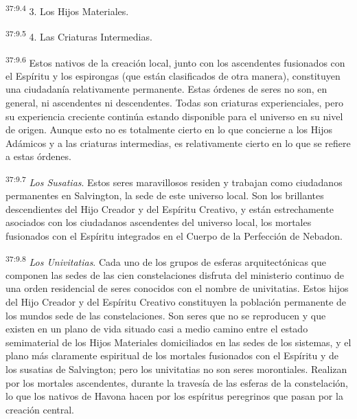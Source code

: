 \par
\textsuperscript{37:9.4} 3. Los Hijos Materiales.

\par
\textsuperscript{37:9.5} 4. Las Criaturas Intermedias.

\par
\textsuperscript{37:9.6} Estos nativos de la creación local, junto con los ascendentes fusionados con el Espíritu y los espirongas (que están clasificados de otra manera), constituyen una ciudadanía relativamente permanente. Estas órdenes de seres no son, en general, ni ascendentes ni descendentes. Todas son criaturas experienciales, pero su experiencia creciente continúa estando disponible para el universo en su nivel de origen. Aunque esto no es totalmente cierto en lo que concierne a los Hijos Adámicos y a las criaturas intermedias, es relativamente cierto en lo que se refiere a estas órdenes.

\par
\textsuperscript{37:9.7} \textit{Los Susatias}. Estos seres maravillosos residen y trabajan como ciudadanos permanentes en Salvington, la sede de este universo local. Son los brillantes descendientes del Hijo Creador y del Espíritu Creativo, y están estrechamente asociados con los ciudadanos ascendentes del universo local, los mortales fusionados con el Espíritu integrados en el Cuerpo de la Perfección de Nebadon.

\par
\textsuperscript{37:9.8} \textit{Los Univitatias}. Cada uno de los grupos de esferas arquitectónicas que componen las sedes de las cien constelaciones disfruta del ministerio continuo de una orden residencial de seres conocidos con el nombre de univitatias. Estos hijos del Hijo Creador y del Espíritu Creativo constituyen la población permanente de los mundos sede de las constelaciones. Son seres que no se reproducen y que existen en un plano de vida situado casi a medio camino entre el estado semimaterial de los Hijos Materiales domiciliados en las sedes de los sistemas, y el plano más claramente espiritual de los mortales fusionados con el Espíritu y de los susatias de Salvington; pero los univitatias no son seres morontiales. Realizan por los mortales ascendentes, durante la travesía de las esferas de la constelación, lo que los nativos de Havona hacen por los espíritus peregrinos que pasan por la creación central.


